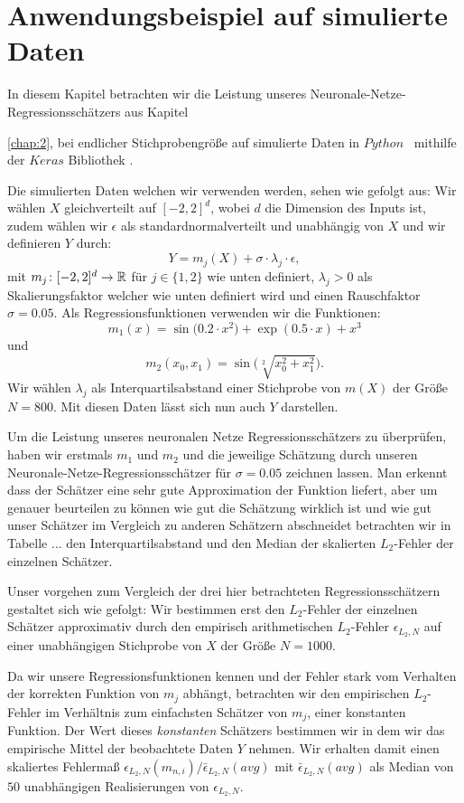 \chapter{Anwendungsbeispiel auf simulierte Daten}
\label{chap:4}

In diesem Kapitel betrachten wir die Leistung unseres Neuronale-Netze-Regressionsschätzers aus Kapitel~{\ref{chap:2}, bei endlicher Stichprobengröße auf simulierte Daten in $Python$~\cite[Version 3.7.3]{van1995python} mithilfe der $Keras$ Bibliothek \cite{chollet2015keras}.

Die simulierten Daten welchen wir verwenden werden, sehen wie gefolgt aus:
Wir wählen $X$ gleichverteilt auf $[-2, 2]^d$, wobei $d$ die Dimension des Inputs ist, zudem wählen wir $\epsilon$ als standardnormalverteilt und unabhängig von $X$ und wir definieren $Y$ durch:
$$Y = m_j(X) + \sigma \cdot \lambda_j \cdot \epsilon,$$ 
mit $m_j \colon [-2, 2]^d \to \mathbb{R}$ für  $j \in \{1, 2\}$ wie unten definiert, $\lambda_j > 0$ als Skalierungsfaktor welcher wie unten definiert wird und einen Rauschfaktor $\sigma = 0.05.$ Als Regressionsfunktionen verwenden wir die Funktionen:
$$ m_1(x) =  \sin\big(0.2 \cdot x^2\big) + \exp(0.5 \cdot x) + x^3$$
und
$$ m_2(x_0, x_1) = \sin\big(\sqrt[2]{x_0^2 + x_1^2}\big).$$
Wir wählen $\lambda_j$ als Interquartilsabstand einer Stichprobe von $m(X)$ der Größe $N = 800$. Mit diesen Daten lässt sich nun auch $Y$ darstellen.

Um die Leistung unseres neuronalen Netze Regressionsschätzers zu überprüfen, haben wir erstmals $m_1$ und $m_2$ und die jeweilige Schätzung durch unseren Neuronale-Netze-Regressionsschätzer für $\sigma = 0.05$ zeichnen lassen. 
Man erkennt dass der Schätzer eine sehr gute Approximation der Funktion liefert, aber um genauer beurteilen zu können wie gut die Schätzung wirklich ist und wie gut unser Schätzer im Vergleich zu anderen Schätzern abschneidet betrachten wir in Tabelle ... den Interquartilsabstand und den Median der skalierten $L_2$-Fehler der einzelnen Schätzer. 

Unser vorgehen zum Vergleich der drei hier betrachteten Regressionsschätzern gestaltet sich wie gefolgt:
Wir bestimmen erst den $L_2$-Fehler der einzelnen Schätzer approximativ durch den empirisch arithmetischen $L_2$-Fehler $\epsilon_{L_2,N}$ auf einer unabhängigen Stichprobe von $X$ der Größe $N = 1000$. 

Da wir unsere Regressionsfunktionen kennen und der Fehler stark vom Verhalten der korrekten Funktion von $m_j$ abhängt, betrachten wir den empirischen $L_2$-Fehler im Verhältnis zum einfachsten Schätzer von $m_j$, einer konstanten Funktion. Der Wert dieses \textit{konstanten} Schätzers bestimmen wir in dem wir das empirische Mittel der beobachtete Daten $Y$ nehmen. Wir erhalten damit einen skaliertes Fehlermaß $\epsilon_{L_2,N}(m_{n,i})/\bar{\epsilon}_{L_2,N}(avg)$ mit $\bar{\epsilon}_{L_2,N}(avg)$ als Median von $50$ unabhängigen Realisierungen von $\epsilon_{L_2,N}$. 

}
